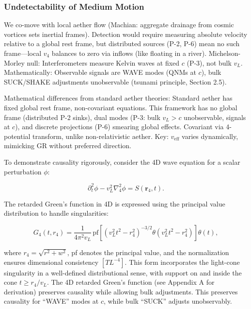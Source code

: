 \subsubsection{Undetectability of Medium Motion}

We co-move with local aether flow (Machian: aggregate drainage from cosmic vortices sets inertial frames). Detection would require measuring absolute velocity relative to a global rest frame, but distributed sources (P-2, P-6) mean no such frame---local $v_4$ balances to zero via inflows (like floating in a river). Michelson-Morley null: Interferometers measure Kelvin waves at fixed $c$ (P-3), not bulk $v_L$. Mathematically: Observable signals are WAVE modes (QNMs at $c$), bulk SUCK/SHAKE adjustments unobservable (tsunami principle, Section 2.5).

Mathematical differences from standard aether theories: Standard aether has fixed global rest frame, non-covariant equations. This framework has no global frame (distributed P-2 sinks), dual modes (P-3: bulk $v_L > c$ unobservable, signals at $c$), and discrete projections (P-6) smearing global effects. Covariant via 4-potential transform, unlike non-relativistic aether. Key: $v_{\text{eff}}$ varies dynamically, mimicking GR without preferred direction.

To demonstrate causality rigorously, consider the 4D wave equation for a scalar perturbation $\phi$:

\begin{equation}
\partial_t^2 \phi - v_L^2 \nabla_4^2 \phi = S(\mathbf{r}_4, t).
\end{equation}

The retarded Green's function in 4D is expressed using the principal value distribution to handle singularities:

\begin{equation}
G_4(t, r_4) = \frac{1}{4 \pi^2 v_L} \, \text{pf} \left[ (v_L^2 t^2 - r_4^2)^{-3/2} \theta(v_L^2 t^2 - r_4^2) \right] \theta(t),
\end{equation}

where $r_4 = \sqrt{r^2 + w^2}$, pf denotes the principal value, and the normalization ensures dimensional consistency $[T L^{-4}]$. This form incorporates the light-cone singularity in a well-defined distributional sense, with support on and inside the cone $t \geq r_4 / v_L$. The 4D retarded Green's function (see Appendix A for derivation) preserves causality while allowing bulk adjustments. This preserves causality for ``WAVE'' modes at $c$, while bulk ``SUCK'' adjusts unobservably.

